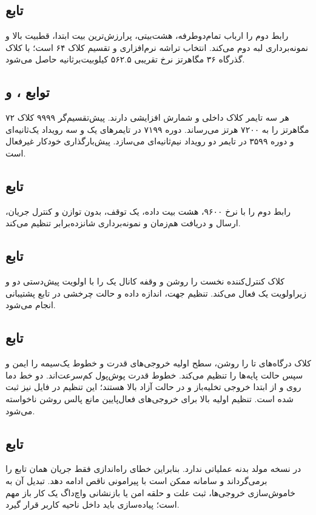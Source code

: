 \subsection{تابع }
رابط دوم را ارباب تمام‌دوطرفه، هشت‌بیتی، پرارزش‌ترین بیت ابتدا، قطبیت بالا و نمونه‌برداری لبه دوم می‌کند. انتخاب تراشه نرم‌افزاری و تقسیم کلاک ۶۴ است؛ با کلاک گذرگاه ۳۶ مگاهرتز نرخ تقریبی ۵۶۲.۵ کیلوبیت‌برثانیه حاصل می‌شود.

\subsection{توابع ،  و }
هر سه تایمر کلاک داخلی و شمارش افزایشی دارند. پیش‌تقسیم‌گر ۹۹۹۹ کلاک ۷۲ مگاهرتز را به ۷۲۰۰ هرتز می‌رساند. دوره ۷۱۹۹ در تایمرهای یک و سه رویداد یک‌ثانیه‌ای و دوره ۳۵۹۹ در تایمر دو رویداد نیم‌ثانیه‌ای می‌سازد. پیش‌بارگذاری خودکار غیرفعال است.

\subsection{تابع }
رابط دوم را با نرخ ۹۶۰۰، هشت بیت داده، یک توقف، بدون توازن و کنترل جریان، ارسال و دریافت هم‌زمان و نمونه‌برداری شانزده‌برابر تنظیم می‌کند.

\subsection{تابع }
کلاک کنترل‌کننده نخست را روشن و وقفه کانال یک را با اولویت پیش‌دستی دو و زیر‌اولویت یک فعال می‌کند. تنظیم جهت، اندازه داده و حالت چرخشی در تابع پشتیبانی
انجام می‌شود.

\subsection{تابع }
کلاک درگاه‌های
تا
را روشن، سطح اولیه خروجی‌های قدرت و خطوط یک‌سیمه را ایمن و سپس حالت پایه‌ها را تنظیم می‌کند. خطوط قدرت پوش‌پول کم‌سرعت‌اند. دو خط دما روی  و  از ابتدا خروجی تخلیه‌باز و در حالت آزاد بالا هستند؛ این تنظیم در فایل  نیز ثبت شده است. تنظیم اولیه بالا برای خروجی‌های فعال‌پایین مانع پالس روشن ناخواسته می‌شود.

\subsection{تابع }
در نسخه مولد بدنه عملیاتی ندارد. بنابراین خطای راه‌اندازی فقط جریان همان تابع را برمی‌گرداند و سامانه ممکن است با پیرامونی ناقص ادامه دهد. تبدیل آن به خاموش‌سازی خروجی‌ها، ثبت علت و حلقه امن یا بازنشانی واچ‌داگ یک کار باز مهم است؛ پیاده‌سازی باید داخل ناحیه کاربر قرار گیرد.

